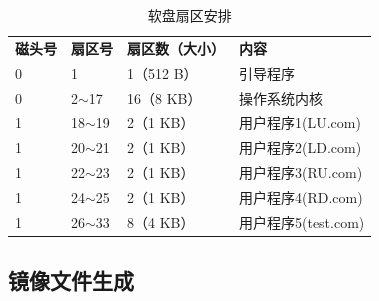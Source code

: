 \documentclass[a4paper, 11pt]{article} %
\begin{document}
\FloatBarrier
\begin{table}[]
\centering
  \caption{软盘扇区安排}
  \label{tab:sectortable}
  \begin{tabular}{llll}
  \rowcolor[HTML]{FFFFFF} 
  {\color[HTML]{333333} \textbf{磁头号}} & {\color[HTML]{333333} \textbf{扇区号}} & {\color[HTML]{333333} \textbf{扇区数（大小）}} & {\color[HTML]{333333} \textbf{内容}} \\
  \rowcolor[HTML]{FFFFFF} 
  {\color[HTML]{333333} 0}            & {\color[HTML]{333333} 1}            & {\color[HTML]{333333} 1（512 B）}         & {\color[HTML]{333333} 引导程序}        \\
  \rowcolor[HTML]{FFFFFF} 
  {\color[HTML]{333333} 0}            & {\color[HTML]{333333} 2$\sim$17}    & {\color[HTML]{333333} 16（8 KB）}         & {\color[HTML]{333333} 操作系统内核}      \\
  \rowcolor[HTML]{F8F8F8} 
  {\color[HTML]{333333} 1}            & {\color[HTML]{333333} 18$\sim$19}     & {\color[HTML]{333333} 2（1 KB）}          & {\color[HTML]{333333} 用户程序1(LU.com)}       \\
  \rowcolor[HTML]{FFFFFF} 
  {\color[HTML]{333333} 1}            & {\color[HTML]{333333} 20$\sim$21}     & {\color[HTML]{333333} 2（1 KB）}          & {\color[HTML]{333333} 用户程序2(LD.com)}       \\
  \rowcolor[HTML]{F8F8F8} 
  {\color[HTML]{333333} 1}            & {\color[HTML]{333333} 22$\sim$23}     & {\color[HTML]{333333} 2（1 KB）}          & {\color[HTML]{333333} 用户程序3(RU.com)}       \\
  \rowcolor[HTML]{FFFFFF} 
  {\color[HTML]{333333} 1}            & {\color[HTML]{333333} 24$\sim$25}     & {\color[HTML]{333333} 2（1 KB）}          & {\color[HTML]{333333} 用户程序4(RD.com)}      \\
  \rowcolor[HTML]{FFFFFF} 
  {\color[HTML]{333333} 1}            & {\color[HTML]{333333} 26$\sim$33}     & {\color[HTML]{333333} 8（4 KB）}          & {\color[HTML]{333333} 用户程序5(test.com)}      
  \end{tabular}
  \end{table}
\subsection{镜像文件生成}
\end{document}
